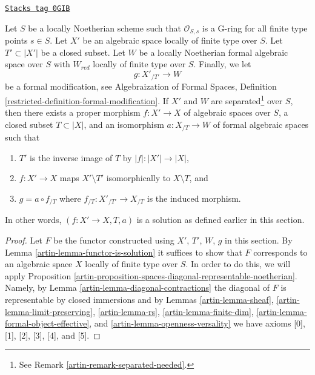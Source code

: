 \begin{theorem}[Contractions]
\label{artin-theorem-contractions}
\href{https://stacks.math.columbia.edu/tag/0GIB}{\texttt{Stacks tag 0GIB}}

\begin{reference}
\cite[Theorem 3.1]{ArtinII}
\end{reference}
Let $S$ be a locally Noetherian scheme such that $\mathcal{O}_{S, s}$
is a G-ring for all finite type points $s \in S$. Let $X'$ be an algebraic
space locally of finite type over $S$. Let $T' \subset |X'|$ be a closed
subset. Let $W$ be a locally Noetherian formal algebraic space over $S$
with $W_{red}$ locally of finite type over $S$. Finally, we let
$$
g : X'_{/T'} \longrightarrow W
$$
be a formal modification, see Algebraization of Formal Spaces, Definition
\ref{restricted-definition-formal-modification}. If $X'$ and $W$ are
separated\footnote{See Remark \ref{artin-remark-separated-needed}.} over $S$, then
there exists a proper morphism $f : X' \to X$ of algebraic spaces over $S$,
a closed subset $T \subset |X|$, and an isomorphism $a : X_{/T} \to W$
of formal algebraic spaces such that
\begin{enumerate}
\item $T'$ is the inverse image of $T$ by $|f| : |X'| \to |X|$,
\item $f : X' \to X$ maps $X' \setminus T'$ isomorphically to
$X \setminus T$, and
\item $g = a \circ f_{/T}$ where $f_{/T} : X'_{/T'} \to X_{/T}$
is the induced morphism.
\end{enumerate}
In other words, $(f : X' \to X, T, a)$ is a solution as defined earlier in
this section.
\end{theorem}

\begin{proof}

Let $F$ be the functor constructed using $X'$, $T'$, $W$, $g$ in this section.
By Lemma \ref{artin-lemma-functor-is-solution} it suffices to show that
$F$ corresponds to an algebraic space $X$ locally of finite type over $S$.
In order to do this, we will apply
Proposition \ref{artin-proposition-spaces-diagonal-representable-noetherian}.
Namely, by Lemma \ref{artin-lemma-diagonal-contractions}
the diagonal of $F$ is representable by closed immersions
and by
Lemmas \ref{artin-lemma-sheaf}, \ref{artin-lemma-limit-preserving},
\ref{artin-lemma-rs}, \ref{artin-lemma-finite-dim},
\ref{artin-lemma-formal-object-effective}, and \ref{artin-lemma-openness-versality}
we have axioms [0], [1], [2], [3], [4], and [5].
\end{proof}


